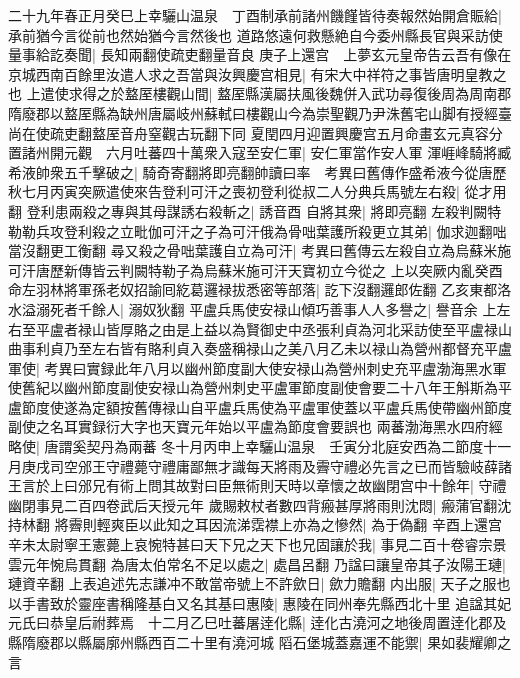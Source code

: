 二十九年春正月癸巳上幸驪山温泉　丁酉制承前諸州饑饉皆待奏報然始開倉賑給|{
	承前猶今言從前也然始猶今言然後也}
道路悠遠何救懸絶自今委州縣長官與采訪使量事給訖奏聞|{
	長知兩翻使疏吏翻量音良}
庚子上還宫　上夢玄元皇帝告云吾有像在京城西南百餘里汝遣人求之吾當與汝興慶宫相見|{
	有宋大中祥符之事皆唐明皇教之也}
上遣使求得之於盩厔樓觀山間|{
	盩厔縣漢屬扶風後魏併入武功尋復後周為周南郡隋廢郡以盩厔縣為缺州唐屬岐州蘇軾曰樓觀山今為崇聖觀乃尹洙舊宅山脚有授經臺尚在使疏吏翻盩厔音舟窒觀古玩翻下同}
夏閏四月迎置興慶宫五月命畫玄元真容分置諸州開元觀　六月吐蕃四十萬衆入寇至安仁軍|{
	安仁軍當作安人軍}
渾崕峰騎將臧希液帥衆五千擊破之|{
	騎奇寄翻將即亮翻帥讀曰率　考異曰舊傳作盛希液今從唐歷}
秋七月丙寅突厥遣使來告登利可汗之喪初登利從叔二人分典兵馬號左右殺|{
	從才用翻}
登利患兩殺之專與其母謀誘右殺斬之|{
	誘音酉}
自將其衆|{
	將即亮翻}
左殺判闕特勒勒兵攻登利殺之立毗伽可汗之子為可汗俄為骨咄葉護所殺更立其弟|{
	伽求迦翻咄當沒翻更工衡翻}
尋又殺之骨咄葉護自立為可汗|{
	考異曰舊傳云左殺自立為烏蘇米施可汗唐歷新傳皆云判闕特勒子為烏蘇米施可汗天寶初立今從之}
上以突厥内亂癸酉命左羽林將軍孫老奴招諭囘紇葛邏禄拔悉密等部落|{
	訖下沒翻邏郎佐翻}
乙亥東都洛水溢溺死者千餘人|{
	溺奴狄翻}
平盧兵馬使安禄山傾巧善事人人多譽之|{
	譽音余}
上左右至平盧者禄山皆厚賂之由是上益以為賢御史中丞張利貞為河北采訪使至平盧禄山曲事利貞乃至左右皆有賂利貞入奏盛稱禄山之美八月乙未以禄山為營州都督充平盧軍使|{
	考異曰實録此年八月以幽州節度副大使安禄山為營州刺史充平盧渤海黑水軍使舊紀以幽州節度副使安禄山為營州刺史平盧軍節度副使會要二十八年王斛斯為平盧節度使遂為定額按舊傳禄山自平盧兵馬使為平盧軍使蓋以平盧兵馬使帶幽州節度副使之名耳實録衍大字也天寶元年始以平盧為節度會要誤也}
兩蕃渤海黑水四府經略使|{
	唐謂奚契丹為兩蕃}
冬十月丙申上幸驪山温泉　壬寅分北庭安西為二節度十一月庚戌司空邠王守禮薨守禮庸鄙無才識每天將雨及霽守禮必先言之已而皆驗岐薛諸王言於上曰邠兄有術上問其故對曰臣無術則天時以章懷之故幽閉宫中十餘年|{
	守禮幽閉事見二百四卷武后天授元年}
歲賜敕杖者數四背瘢甚厚將雨則沈悶|{
	瘢蒲官翻沈持林翻}
將霽則輕爽臣以此知之耳因流涕霑襟上亦為之慘然|{
	為于偽翻}
辛酉上還宫　辛未太尉寧王憲薨上哀惋特甚曰天下兄之天下也兄固讓於我|{
	事見二百十卷睿宗景雲元年惋烏貫翻}
為唐太伯常名不足以處之|{
	處昌呂翻}
乃諡曰讓皇帝其子汝陽王璉|{
	璉資辛翻}
上表追述先志謙冲不敢當帝號上不許歛日|{
	歛力贍翻}
内出服|{
	天子之服也}
以手書致於靈座書稱隆基白又名其基曰惠陵|{
	惠陵在同州奉先縣西北十里}
追諡其妃元氏曰恭皇后祔葬焉　十二月乙巳吐蕃屠逹化縣|{
	逹化古澆河之地後周置逹化郡及縣隋廢郡以縣屬廓州縣西百二十里有澆河城}
䧟石堡城蓋嘉運不能禦|{
	果如裴耀卿之言}


